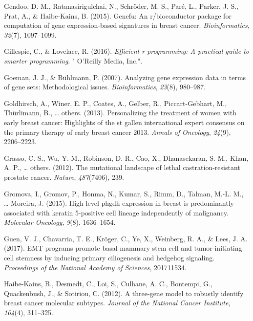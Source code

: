 \documentclass[12pt,twoside]{reedthesis}
\begin{document}
\leavevmode\hypertarget{ref-gendoo2015genefu}{}%
Gendoo, D. M., Ratanasirigulchai, N., Schröder, M. S., Paré, L., Parker, J. S., Prat, A., \& Haibe-Kains, B. (2015). Genefu: An r/bioconductor package for computation of gene expression-based signatures in breast cancer. \emph{Bioinformatics}, \emph{32}(7), 1097--1099.

\leavevmode\hypertarget{ref-gillespie2016efficient}{}%
Gillespie, C., \& Lovelace, R. (2016). \emph{Efficient r programming: A practical guide to smarter programming}. " O'Reilly Media, Inc.".

\leavevmode\hypertarget{ref-goeman2007analyzing}{}%
Goeman, J. J., \& Bühlmann, P. (2007). Analyzing gene expression data in terms of gene sets: Methodological issues. \emph{Bioinformatics}, \emph{23}(8), 980--987.

\leavevmode\hypertarget{ref-goldhirsch2013personalizing}{}%
Goldhirsch, A., Winer, E. P., Coates, A., Gelber, R., Piccart-Gebhart, M., Thürlimann, B., \ldots{} others. (2013). Personalizing the treatment of women with early breast cancer: Highlights of the st gallen international expert consensus on the primary therapy of early breast cancer 2013. \emph{Annals of Oncology}, \emph{24}(9), 2206--2223.

\leavevmode\hypertarget{ref-grasso2012mutational}{}%
Grasso, C. S., Wu, Y.-M., Robinson, D. R., Cao, X., Dhanasekaran, S. M., Khan, A. P., \ldots{} others. (2012). The mutational landscape of lethal castration-resistant prostate cancer. \emph{Nature}, \emph{487}(7406), 239.

\leavevmode\hypertarget{ref-gromova2015high}{}%
Gromova, I., Gromov, P., Honma, N., Kumar, S., Rimm, D., Talman, M.-L. M., \ldots{} Moreira, J. (2015). High level phgdh expression in breast is predominantly associated with keratin 5-positive cell lineage independently of malignancy. \emph{Molecular Oncology}, \emph{9}(8), 1636--1654.

\leavevmode\hypertarget{ref-guen2017emt}{}%
Guen, V. J., Chavarria, T. E., Kröger, C., Ye, X., Weinberg, R. A., \& Lees, J. A. (2017). EMT programs promote basal mammary stem cell and tumor-initiating cell stemness by inducing primary ciliogenesis and hedgehog signaling. \emph{Proceedings of the National Academy of Sciences}, 201711534.

\leavevmode\hypertarget{ref-haibe2012three}{}%
Haibe-Kains, B., Desmedt, C., Loi, S., Culhane, A. C., Bontempi, G., Quackenbush, J., \& Sotiriou, C. (2012). A three-gene model to robustly identify breast cancer molecular subtypes. \emph{Journal of the National Cancer Institute}, \emph{104}(4), 311--325.
\end{document}
